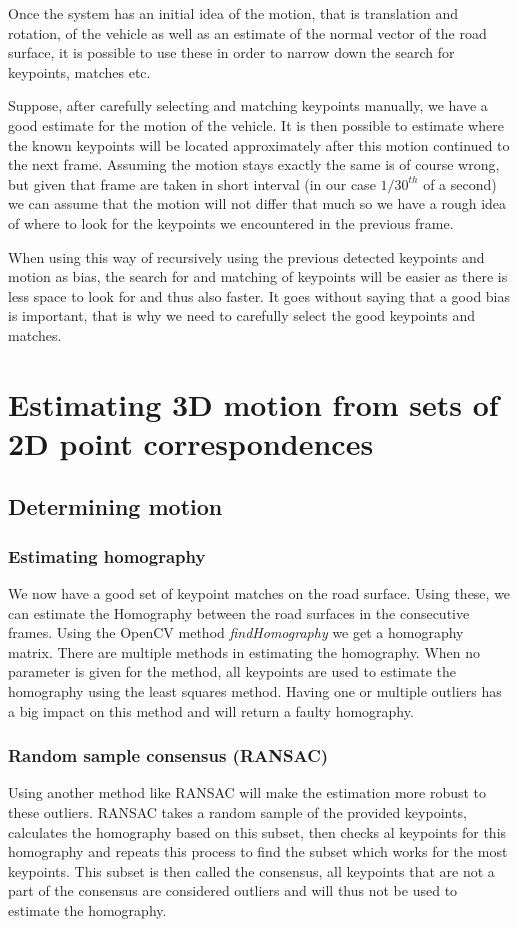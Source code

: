 Once the system has an initial idea of the motion, that is translation and rotation, of the vehicle as well as an estimate of the normal vector of the road surface, it is possible to use these in order to narrow down the search for keypoints, matches etc.\bigskip

Suppose, after carefully selecting and matching keypoints manually, we have a good estimate for the motion of the vehicle. It is then possible to estimate where the known keypoints will be located approximately after this motion continued to the next frame. Assuming the motion stays exactly the same is of course wrong, but given that frame are taken in short interval (in our case $1/30^{th}$ of a second) we can assume that the motion will not differ that much so we have a rough idea of where to look for the keypoints we encountered in the previous frame.\bigskip

When using this way of recursively using the previous detected keypoints and motion as bias, the search for and matching of keypoints will be easier as there is less space to look for and thus also faster. It goes without saying that a good bias is important, that is why we need to carefully select the good keypoints and matches. 

\section{Estimating 3D motion from sets of 2D point correspondences}
\subsection{Determining motion}
\subsubsection{Estimating homography}
We now have a good set of keypoint matches on the road surface. Using these, we can estimate the Homography between the road surfaces in the consecutive frames. Using the OpenCV method \textit{findHomography} we get a homography matrix. There are multiple methods in estimating the homography. When no parameter is given for the method, all keypoints are used to estimate the homography using the least squares method. Having one or multiple outliers has a big impact on this method and will return a faulty homography. \bigskip

\subsubsection{Random sample consensus (RANSAC)}
Using another method like RANSAC will make the estimation more robust to these outliers. RANSAC takes a random sample of the provided keypoints, calculates the homography based on this subset, then checks al keypoints for this homography and repeats this process to find the subset which works for the most keypoints. This subset is then called the consensus, all keypoints that are not a part of the consensus are considered outliers and will thus not be used to estimate the homography. 

